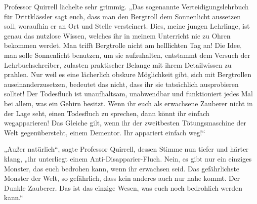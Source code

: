 Professor Quirrell lächelte sehr grimmig. „Das sogenannte Verteidigungslehrbuch für Drittklässler sagt euch, dass man den Bergtroll dem Sonnenlicht aussetzen soll, woraufhin er an Ort und Stelle versteinert. Dies, meine jungen Lehrlinge, ist genau das nutzlose Wissen, welches ihr in meinem Unterricht nie zu Ohren bekommen werdet. Man trifft Bergtrolle nicht am helllichten Tag an! Die Idee, man solle Sonnenlicht benutzen, um sie aufzuhalten, entstammt dem Versuch der Lehrbuchschreiber, zulasten praktischer Belange mit ihrem Detailwissen zu prahlen. Nur weil es eine lächerlich obskure Möglichkeit gibt, sich mit Bergtrollen auseinanderzusetzen, bedeutet das nicht, dass ihr sie tatsächlich ausprobieren solltet! Der Todesfluch ist unaufhaltsam, unabwendbar und funktioniert jedes Mal bei allem, was ein Gehirn besitzt. Wenn ihr euch als erwachsene Zauberer nicht in der Lage seht, einen Todesfluch zu sprechen, dann könnt ihr einfach wegapparieren! Das Gleiche gilt, wenn ihr der zweitbesten Tötungsmaschine der Welt gegenübersteht, einem Dementor. Ihr appariert einfach weg!“

„Außer natürlich“, sagte Professor Quirrell, dessen Stimme nun tiefer und härter klang, „ihr unterliegt einem Anti-Disapparier-Fluch. Nein, es gibt nur ein einziges Monster, das euch bedrohen kann, wenn ihr erwachsen seid. Das gefährlichste Monster der Welt, so gefährlich, dass kein anderes auch nur nahe kommt. Der Dunkle Zauberer. Das ist das einzige Wesen, was euch noch bedrohlich werden kann.“

